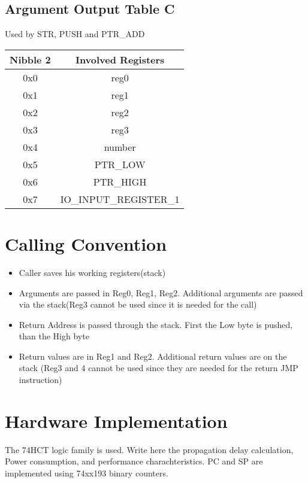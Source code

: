 \documentclass[a4paper, 12pt]{article}
\begin{document}
	\subsection{Argument Output Table C}
	Used by STR, PUSH and PTR\_ADD
	\begin{center}
		\begin{tabular}{|c|c|}
			\hline
			Nibble 2 & Involved Registers \\ \hline
			0x0 & reg0 \\ \hline
			0x1 & reg1 \\ \hline
			0x2 & reg2 \\ \hline
			0x3 & reg3 \\ \hline
			0x4 & number \\ \hline
			0x5 & PTR\_LOW \\ \hline
			0x6 & PTR\_HIGH \\ \hline
			0x7 & IO\_INPUT\_REGISTER\_1 \\ \hline
		\end{tabular}
	\end{center}
	\section{Calling Convention}
		\begin{itemize}
			\item Caller saves his working registers(stack)
			\item Arguments are passed in Reg0, Reg1, Reg2. Additional arguments are passed via the stack(Reg3 cannot be used since it is needed for the call)
			\item Return Address is passed through the stack. First the Low byte is pushed, than the High byte
			\item Return values are in Reg1 and Reg2. Additional return values are on the stack (Reg3 and 4 cannot be used since they are needed for the return JMP instruction)
		\end{itemize}
	\section{Hardware Implementation}
	The 74HCT logic family is used.  Write here the propagation delay calculation, Power consumption, and performance charachteristics.
	PC and SP are implemented using 74xx193 binary counters.
\end{document}

